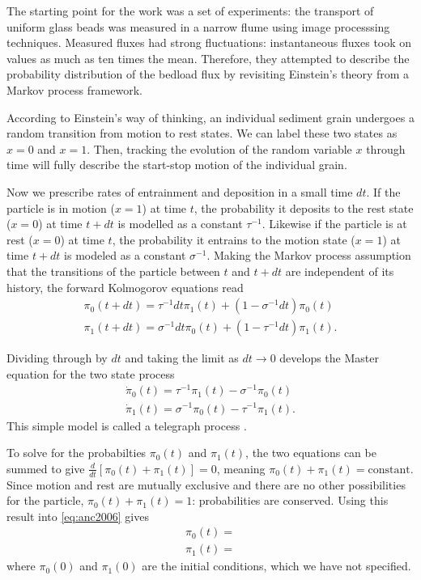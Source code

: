 The starting point for the \citet{Ancey2006} work was a set of experiments: the transport of uniform glass beads was measured in a narrow flume using image processsing techniques. 
Measured fluxes had strong fluctuations: instantaneous fluxes took on values as much as ten times the mean. 
Therefore, they attempted to describe the probability distribution of the bedload flux by revisiting Einstein's theory \citep{Einstein1950} from a Markov process framework. 

According to Einstein's way of thinking, an individual sediment grain undergoes a random transition from motion to rest states. We can label these two states as $x=0$ and $x=1$. Then, tracking the evolution of the random variable $x$ through time will fully describe the start-stop motion of the individual grain. 

Now we prescribe rates of entrainment and deposition in a small time $dt$. 
If the particle is in motion ($x=1$) at time $t$, the probability it deposits to the rest state ($x=0$) at time $t+dt$ is modelled as a constant $\tau^{-1}$. 
Likewise if the particle is at rest ($x=0$) at time $t$, the probability it entrains to the motion state ($x=1$) at time $t+dt$ is modeled as a constant $\sigma^{-1}$. 
Making the Markov process assumption that the transitions of the particle between $t$ and $t+dt$ are independent of its history, the forward Kolmogorov equations read
\begin{align} 
\pi_0(t+dt) = \tau^{-1} dt \pi_1(t) + (1-\sigma^{-1} dt) \pi_0(t) \\
\pi_1(t+dt) = \sigma^{-1} dt \pi_0(t) + (1-\tau^{-1} dt) \pi_1(t). 
\end{align} 

Dividing through by $dt$ and taking the limit as $dt \rightarrow 0$ develops the Master equation for the two state process
\begin{align} \label{eq:anc2006}
\dot{\pi}_0(t) = \tau^{-1} \pi_1(t) - \sigma^{-1} \pi_0(t) \\
\dot{\pi}_1(t) = \sigma^{-1} \pi_0(t) - \tau^{-1} \pi_1(t). 
\end{align} 
This simple model is called a telegraph process \citep{Cox1965}. 

To solve for the probabilties $\pi_0(t)$ and $\pi_1(t)$, the two equations can be summed to give $\frac{d}{dt} [ \pi_0(t) +\pi_1(t) ] = 0$, meaning $\pi_0(t) + \pi_1(t) = \text{constant}$. Since motion and rest are mutually exclusive and there are no other possibilities for the particle, $\pi_0(t) + \pi_1(t) = 1$: probabilities are conserved. 
Using this result into \ref{eq:anc2006} gives 
\begin{align} 
\pi_0(t) =  \\
\pi_1(t) = 
\end{align} 
where $\pi_0(0)$ and $\pi_1(0)$ are the initial conditions, which we have not specified. 


